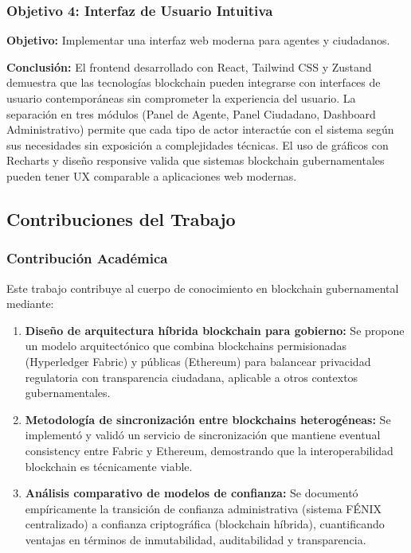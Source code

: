 \subsubsection{Objetivo 4: Interfaz de Usuario Intuitiva}

\textbf{Objetivo:} Implementar una interfaz web moderna para agentes y ciudadanos.

\textbf{Conclusión:} El frontend desarrollado con React, Tailwind CSS y Zustand demuestra que las tecnologías blockchain pueden integrarse con interfaces de usuario contemporáneas sin comprometer la experiencia del usuario. La separación en tres módulos (Panel de Agente, Panel Ciudadano, Dashboard Administrativo) permite que cada tipo de actor interactúe con el sistema según sus necesidades sin exposición a complejidades técnicas. El uso de gráficos con Recharts y diseño responsive valida que sistemas blockchain gubernamentales pueden tener UX comparable a aplicaciones web modernas.

\subsection{Contribuciones del Trabajo}

\subsubsection{Contribución Académica}

Este trabajo contribuye al cuerpo de conocimiento en blockchain gubernamental mediante:

\begin{enumerate}
    \item \textbf{Diseño de arquitectura híbrida blockchain para gobierno:} Se propone un modelo arquitectónico que combina blockchains permisionadas (Hyperledger Fabric) y públicas (Ethereum) para balancear privacidad regulatoria con transparencia ciudadana, aplicable a otros contextos gubernamentales.
    
    \item \textbf{Metodología de sincronización entre blockchains heterogéneas:} Se implementó y validó un servicio de sincronización que mantiene eventual consistency entre Fabric y Ethereum, demostrando que la interoperabilidad blockchain es técnicamente viable.
    
    \item \textbf{Análisis comparativo de modelos de confianza:} Se documentó empíricamente la transición de confianza administrativa (sistema FÉNIX centralizado) a confianza criptográfica (blockchain híbrida), cuantificando ventajas en términos de inmutabilidad, auditabilidad y transparencia.
\end{enumerate}

